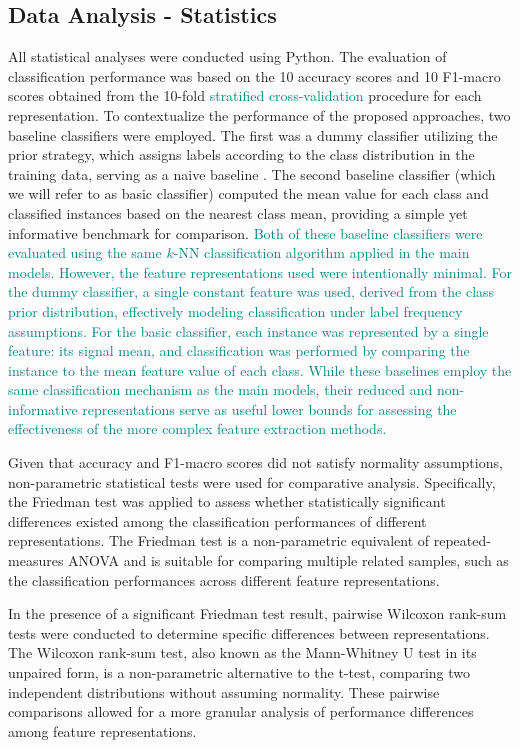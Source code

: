 \documentclass{article}
\begin{document}
\subsection{Data Analysis - Statistics}
All statistical analyses were conducted using Python. The evaluation of classification performance was based on the 10 accuracy scores and 10 F1-macro scores obtained from the 10-fold \textcolor{teal}{stratified cross-validation} procedure for each representation. To contextualize the performance of the proposed approaches, two baseline classifiers were employed. The first was a dummy classifier utilizing the prior strategy, which assigns labels according to the class distribution in the training data, serving as a naive baseline \cite{scikit-learn}. The second baseline classifier (which we will refer to as basic classifier) computed the mean value for each class and classified instances based on the nearest class mean, providing a simple yet informative benchmark for comparison. \textcolor{teal}{Both of these baseline classifiers were evaluated using the same $k$-NN classification algorithm applied in the main models. However, the feature representations used were intentionally minimal. For the dummy classifier, a single constant feature was used, derived from the class prior distribution, effectively modeling classification under label frequency assumptions. For the basic classifier, each instance was represented by a single feature: its signal mean, and classification was performed by comparing the instance to the mean feature value of each class. While these baselines employ the same classification mechanism as the main models, their reduced and non-informative representations serve as useful lower bounds for assessing the effectiveness of the more complex feature extraction methods.}

Given that accuracy and F1-macro scores did not satisfy normality assumptions, non-parametric statistical tests were used for comparative analysis. Specifically, the Friedman test \cite{friedman1937} was applied to assess whether statistically significant differences existed among the classification performances of different representations. The Friedman test is a non-parametric equivalent of repeated-measures ANOVA and is suitable for comparing multiple related samples, such as the classification performances across different feature representations.

In the presence of a significant Friedman test result, pairwise Wilcoxon rank-sum tests \cite{wilcoxon1992} were conducted to determine specific differences between representations. The Wilcoxon rank-sum test, also known as the Mann-Whitney U test in its unpaired form, is a non-parametric alternative to the t-test, comparing two independent distributions without assuming normality. These pairwise comparisons allowed for a more granular analysis of performance differences among feature representations.
\end{document}
